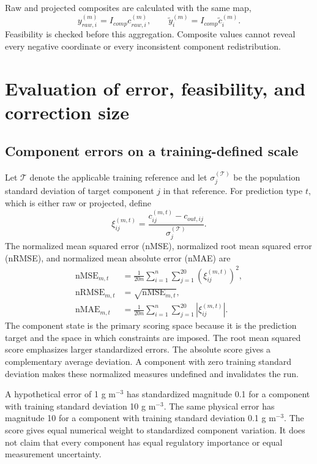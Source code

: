 Raw and projected composites are calculated with the same map,
\begin{equation}
y_{raw,i}^{(m)}=I_{comp}c_{raw,i}^{(m)},\qquad
\tilde y_i^{(m)}=I_{comp}\tilde c_i^{(m)}.
\label{eq:projection_paired_composites}
\end{equation}
Feasibility is checked before this aggregation. Composite values cannot reveal every negative coordinate or every inconsistent component redistribution.

\section{Evaluation of error, feasibility, and correction size}

\subsection{Component errors on a training-defined scale}

Let $\mathcal{T}$ denote the applicable training reference and let $\sigma_j^{(\mathcal{T})}$ be the population standard deviation of target component $j$ in that reference. For prediction type $t$, which is either raw or projected, define
\begin{equation}
\xi_{ij}^{(m,t)}=
\frac{c_{ij}^{(m,t)}-c_{out,ij}}{\sigma_j^{(\mathcal{T})}}.
\label{eq:projection_standardized_error}
\end{equation}
The normalized mean squared error (nMSE), normalized root mean squared error (nRMSE), and normalized mean absolute error (nMAE) are
\begin{align}
\mathrm{nMSE}_{m,t}&=\frac{1}{20n}\sum_{i=1}^{n}\sum_{j=1}^{20}(\xi_{ij}^{(m,t)})^2,\label{eq:projection_nmse}\\
\mathrm{nRMSE}_{m,t}&=\sqrt{\mathrm{nMSE}_{m,t}},\label{eq:projection_nrmse}\\
\mathrm{nMAE}_{m,t}&=\frac{1}{20n}\sum_{i=1}^{n}\sum_{j=1}^{20}|\xi_{ij}^{(m,t)}|.
\label{eq:projection_nmae}
\end{align}
The component state is the primary scoring space because it is the prediction target and the space in which constraints are imposed. The root mean squared score emphasizes larger standardized errors. The absolute score gives a complementary average deviation. A component with zero training standard deviation makes these normalized measures undefined and invalidates the run.

A hypothetical error of 1 g m$^{-3}$ has standardized magnitude 0.1 for a component with training standard deviation 10 g m$^{-3}$. The same physical error has magnitude 10 for a component with training standard deviation 0.1 g m$^{-3}$. The score gives equal numerical weight to standardized component variation. It does not claim that every component has equal regulatory importance or equal measurement uncertainty.


